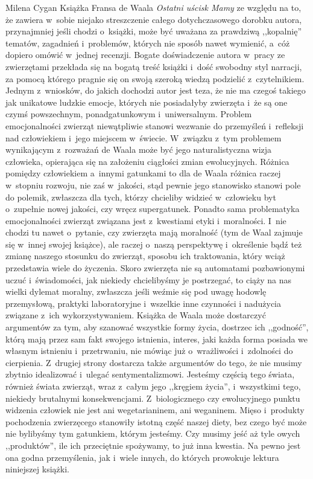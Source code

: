 \begin{newrevplenv}{Milena Cygan}
Książka Fransa de Waala \textit{Ostatni uścisk Mamy} ze względu na to, że zawiera w~sobie niejako streszczenie całego dotychczasowego dorobku autora, przynajmniej jeśli chodzi o~książki, może być uważana za prawdziwą ,,kopalnię'' tematów, zagadnień i~problemów, których nie sposób nawet wymienić, a~cóż dopiero omówić w~jednej recenzji. Bogate doświadczenie autora w~pracy ze zwierzętami przekłada się na bogatą treść książki i~dość swobodny styl narracji, za pomocą którego pragnie się on swoją szeroką wiedzą podzielić z~czytelnikiem. Jednym z~wniosków, do jakich dochodzi autor jest teza, że nie ma czegoś takiego jak unikatowe ludzkie emocje, których nie posiadałyby zwierzęta i~że są one czymś powszechnym, ponadgatunkowym i~uniwersalnym. Problem emocjonalności zwierząt niewątpliwie stanowi wezwanie do przemyśleń i~refleksji nad człowiekiem i~jego miejscem w~świecie. W~związku z~tym problemem wynikającym z~rozważań de Waala może być jego naturalistyczna wizja człowieka, opierająca się na założeniu ciągłości zmian ewolucyjnych. Różnica pomiędzy człowiekiem a~innymi gatunkami to dla de Waala różnica raczej w~stopniu rozwoju, nie zaś w~jakości, stąd pewnie jego stanowisko stanowi pole do polemik, zwłaszcza dla tych, którzy chcieliby widzieć w~człowieku byt o~zupełnie nowej jakości, czy wręcz supergatunek. Ponadto sama problematyka emocjonalności zwierząt związana jest z~kwestiami etyki i~moralności. I~nie chodzi tu nawet o~pytanie, czy zwierzęta mają moralność (tym de Waal zajmuje się w~innej swojej książce), ale raczej o~naszą perspektywę i~określenie bądź też zmianę naszego stosunku do zwierząt, sposobu ich traktowania, który wciąż przedstawia wiele do życzenia. Skoro zwierzęta nie są automatami pozbawionymi uczuć i~świadomości, jak niekiedy chcielibyśmy je postrzegać, to ciąży na nas wielki dylemat moralny, zwłaszcza jeśli weźmie się pod uwagę hodowlę przemysłową, praktyki laboratoryjne i~wszelkie inne czynności i nadużycia związane z~ich wykorzystywaniem. Książka de Waala może dostarczyć argumentów za tym, aby szanować wszystkie formy życia, dostrzec ich ,,godność'', którą mają przez sam fakt swojego istnienia, interes, jaki każda forma posiada we własnym istnieniu i~przetrwaniu, nie mówiąc już o~wrażliwości i~zdolności do cierpienia. Z~drugiej strony dostarcza także argumentów do tego, że nie musimy zbytnio idealizować i~ulegać sentymentalizmowi. Jesteśmy częścią tego świata, również świata zwierząt, wraz z~całym jego ,,kręgiem życia'', i~wszystkimi tego, niekiedy brutalnymi konsekwencjami. Z~biologicznego czy ewolucyjnego punktu widzenia człowiek nie jest ani wegetarianinem, ani weganinem. Mięso i~produkty pochodzenia zwierzęcego stanowiły istotną część naszej diety, bez czego być może nie bylibyśmy tym gatunkiem, którym jesteśmy. Czy musimy jeść aż tyle owych ,,produktów'', ile ich przeciętnie spożywamy, to już inna kwestia. Na pewno jest ona godna przemyślenia, jak i~wiele innych, do których prowokuje lektura niniejszej książki.


\end{newrevplenv}
